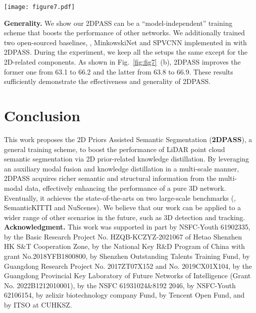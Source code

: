 \documentclass[runningheads]{llncs}
\begin{document}
		\begin{figure*}[t]
		\begin{centering}
			
			\texttt{[image: figure7.pdf]}
\caption{\textbf{Extensive experiment results.} The part (a) shows the results on SemanticKITTI validation set with different distance-range. Part (b) demonstrates the results before and after exploiting 2DPASS on  MinkowskiNet~\cite{tang2020searching} and SPVCNN~\cite{tang2020searching}.
			}
			\label{fig:fig7}
		\end{centering}	
	\end{figure*}
	
	\noindent\textbf{Generality.}
We show our 2DPASS can be a ``model-independent'' training scheme that boosts the performance of other networks.
We additionally trained two open-sourced baselines, \ie, MinkowskiNet and SPVCNN implemented in \cite{tang2020searching} with 2DPASS. During the experiment, we keep all the setups the same except for the 2D-related components.
As shown in Fig.~\ref{fig:fig7}~(b), 2DPASS improves the former one from 63.1 to 66.2 and the latter from 63.8 to 66.9.
These results sufficiently demonstrate the effectiveness and generality of 2DPASS.

	
	\section{Conclusion}
	
	This work proposes the {2D Priors Assisted Semantic Segmentation} ({\textbf{2DPASS}}), a general training scheme, to boost the performance of LiDAR point cloud semantic segmentation via 2D prior-related knowledge distillation.
By leveraging an auxiliary modal fusion and knowledge distillation in a multi-scale manner, 2DPASS acquires richer semantic and structural information from the multi-modal data, effectively enhancing the performance of a pure 3D network.
Eventually, it achieves the state-of-the-arts on two large-scale benchmarks (\ie, SemanticKITTI and NuScenes).
We believe that our work can be applied to a wider range of other scenarios in the future, such as 3D detection and tracking. 
	\\	
	
	{{\noindent\textbf{Acknowledgment.}} 	This work was supported in part by NSFC-Youth 61902335, by the Basic Research Project No. HZQB-KCZYZ-2021067 of Hetao Shenzhen HK S\&T Cooperation Zone, by the National Key R\&D Program of China with grant No.2018YFB1800800, by Shenzhen Outstanding Talents Training Fund, by Guangdong Research Project No. 2017ZT07X152 and No. 2019CX01X104, by the Guangdong Provincial Key Laboratory of Future Networks of Intelligence (Grant No. 2022B1212010001), by the NSFC 61931024\&8192 2046, by NSFC-Youth 62106154, by zelixir biotechnology company Fund, by Tencent Open Fund, and by ITSO at CUHKSZ.}
	
\end{document}

